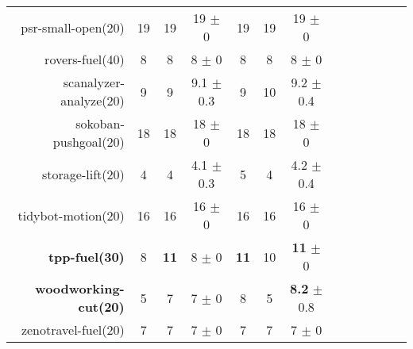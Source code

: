 \begin{center}
\begin{tabular}{|r|*{4}{ccc|}}
psr-small-open(20) & 19 & 19 & 19 \(\pm\) 0 & 19 & 19 & 19 \(\pm\) 0\\
rovers-fuel(40) & 8 & 8 & 8 \(\pm\) 0 & 8 & 8 & 8 \(\pm\) 0\\
scanalyzer-analyze(20) & 9 & 9 & 9.1 \(\pm\) 0.3 & 9 & 10 & 9.2 \(\pm\) 0.4\\
sokoban-pushgoal(20) & 18 & 18 & 18 \(\pm\) 0 & 18 & 18 & 18 \(\pm\) 0\\
storage-lift(20) & 4 & 4 & 4.1 \(\pm\) 0.3 & 5 & 4 & 4.2 \(\pm\) 0.4\\
tidybot-motion(20) & 16 & 16 & 16 \(\pm\) 0 & 16 & 16 & 16 \(\pm\) 0\\
\textbf{tpp-fuel(30)} & 8 & \textbf{11} & 8 \(\pm\) 0 & \textbf{11} & 10 & \textbf{11} \(\pm\) 0\\
\textbf{woodworking-cut(20)} & 5 & 7 & 7 \(\pm\) 0 & 8 & 5 & \textbf{8.2} \(\pm\) 0.8\\
zenotravel-fuel(20) & 7 & 7 & 7 \(\pm\) 0 & 7 & 7 & 7 \(\pm\) 0\\
\end{tabular}
\end{center}
